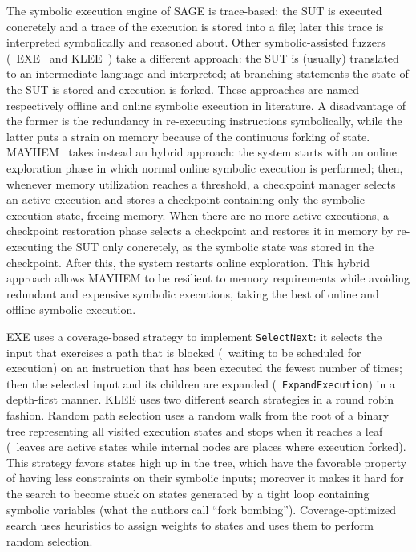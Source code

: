 The symbolic execution engine of SAGE is trace-based: the \ac{SUT} is executed
concretely and a trace of the execution is stored into a file; later this trace
is interpreted symbolically and reasoned about. Other symbolic-assisted fuzzers
(\eg~EXE~\cite{cadar2008exe} and KLEE~\cite{cadar2008klee}) take a different
approach: the \ac{SUT} is (usually) translated to an intermediate language and
interpreted; at branching statements the state of the \ac{SUT} is stored and
execution is forked. These approaches are named respectively offline and online
symbolic execution in literature. A disadvantage of the former is the redundancy
in re-executing instructions symbolically, while the latter puts a strain on
memory because of the continuous forking of state.
MAYHEM~\cite{cha2012unleashing} takes instead an hybrid approach: the system
starts with an online exploration phase in which normal online symbolic
execution is performed; then, whenever memory utilization reaches a threshold, a
checkpoint manager selects an active execution and stores a checkpoint
containing only the symbolic execution state, freeing memory. When there are no
more active executions, a checkpoint restoration phase selects a checkpoint and
restores it in memory by re-executing the \ac{SUT} only concretely, as the
symbolic state was stored in the checkpoint. After this, the system restarts
online exploration. This hybrid approach allows MAYHEM to be resilient to memory
requirements while avoiding redundant and expensive symbolic executions, taking
the best of online and offline symbolic execution.

EXE uses a coverage-based strategy to implement \texttt{SelectNext}: it selects
the input that exercises a path that is blocked (\ie~waiting to be scheduled for
execution) on an instruction that has been executed the fewest number of times;
then the selected input and its children are expanded
(\ie~\texttt{ExpandExecution}) in a depth-first manner. KLEE uses two different
search strategies in a round robin fashion. Random path selection uses a random
walk from the root of a binary tree representing all visited execution states
and stops when it reaches a leaf (\ie~leaves are active states while internal
nodes are places where execution forked). This strategy favors states high up in
the tree, which have the favorable property of having less constraints on their
symbolic inputs; moreover it makes it hard for the search to become stuck on
states generated by a tight loop containing symbolic variables (what the authors
call ``fork bombing''). Coverage-optimized search uses heuristics to assign
weights to states and uses them to perform random selection.

